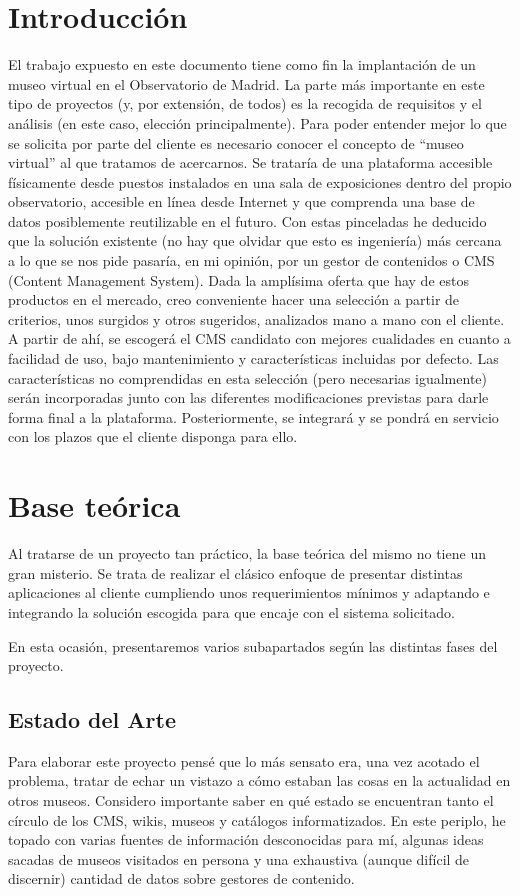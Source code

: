 \section{Introducción}
El trabajo expuesto en este documento tiene como fin la implantación de un museo virtual en el Observatorio de Madrid. La parte más importante en este tipo de proyectos (y, por extensión, de todos) es la recogida de requisitos y el análisis (en este caso, elección principalmente).
Para poder entender mejor lo que se solicita por parte del cliente es necesario conocer el concepto de ``museo virtual'' al que tratamos de acercarnos. Se trataría de una plataforma accesible físicamente desde puestos instalados en una sala de exposiciones dentro del propio observatorio, accesible en línea desde Internet y que comprenda una base de datos posiblemente reutilizable en el futuro. Con estas pinceladas he deducido que la solución existente (no hay que olvidar que esto es ingeniería) más cercana a lo que se nos pide pasaría, en mi opinión, por un gestor de contenidos o CMS (Content Management System).
Dada la amplísima oferta que hay de estos productos en el mercado, creo conveniente hacer una selección a partir de criterios, unos surgidos y otros sugeridos, analizados mano a mano con el cliente.
A partir de ahí, se escogerá el CMS candidato con mejores cualidades en cuanto a facilidad de uso, bajo mantenimiento y características incluidas por defecto. Las características no comprendidas en esta selección (pero necesarias igualmente) serán incorporadas junto con las diferentes modificaciones previstas para darle forma final a la plataforma. Posteriormente, se integrará y se pondrá en servicio con los plazos que el cliente disponga para ello.

\section{Base teórica}
Al tratarse de un proyecto tan práctico, la base teórica del mismo no tiene un gran misterio. Se trata de realizar el clásico enfoque de presentar distintas aplicaciones al cliente cumpliendo unos requerimientos mínimos y adaptando e integrando la solución escogida para que encaje con el sistema solicitado.

En esta ocasión, presentaremos varios subapartados según las distintas fases del proyecto.

\subsection{Estado del Arte}
\par Para elaborar este proyecto pensé que lo más sensato era, una vez acotado el problema, tratar de echar un vistazo a cómo estaban las cosas en la actualidad en otros museos. Considero importante saber en qué estado se encuentran tanto el círculo de los CMS, wikis, museos y catálogos informatizados.
En este periplo, he topado con varias fuentes de información desconocidas para mí, algunas ideas sacadas de museos visitados en persona y una exhaustiva (aunque difícil de discernir) cantidad de datos sobre gestores de contenido.

